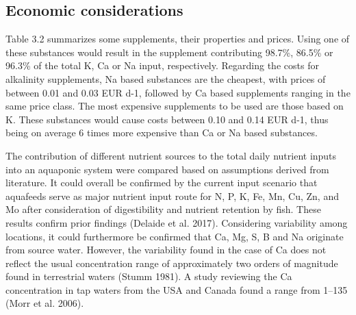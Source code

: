 \documentclass[preprint, 3p,
authoryear]{elsarticle} %
\begin{document}
\hypertarget{economic-considerations}{%
\subsection{Economic considerations}\label{economic-considerations}}

Table 3.2 summarizes some supplements, their properties and prices.
Using one of these substances would result in the supplement
contributing 98.7\%, 86.5\% or 96.3\% of the total K, Ca or Na input,
respectively. Regarding the costs for alkalinity supplements, Na based
substances are the cheapest, with prices of between 0.01 and 0.03 EUR
d-1, followed by Ca based supplements ranging in the same price class.
The most expensive supplements to be used are those based on K. These
substances would cause costs between 0.10 and 0.14 EUR d-1, thus being
on average 6 times more expensive than Ca or Na based substances.

The contribution of different nutrient sources to the total daily
nutrient inputs into an aquaponic system were compared based on
assumptions derived from literature. It could overall be confirmed by
the current input scenario that aquafeeds serve as major nutrient input
route for N, P, K, Fe, Mn, Cu, Zn, and Mo after consideration of
digestibility and nutrient retention by fish. These results confirm
prior findings (Delaide et al. 2017). Considering variability among
locations, it could furthermore be confirmed that Ca, Mg, S, B and Na
originate from source water. However, the variability found in the case
of Ca does not reflect the usual concentration range of approximately
two orders of magnitude found in terrestrial waters (Stumm 1981). A
study reviewing the Ca concentration in tap waters from the USA and
Canada found a range from \SIrange{1}{135}{\mgL} (Morr et al. 2006).
\end{document}
